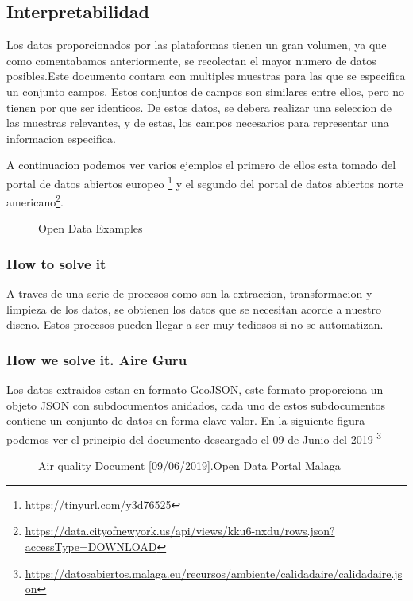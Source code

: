 \subsection{Interpretabilidad}

Los datos proporcionados por las plataformas tienen un gran volumen, ya que como comentabamos anteriormente, se recolectan
el mayor numero de datos posibles.Este documento contara con multiples muestras para las que
se especifica un conjunto campos. Estos conjuntos de campos son similares entre ellos, pero no tienen por que ser identicos. 
De estos datos, se debera realizar una seleccion de las muestras relevantes, y de estas, los campos necesarios para representar
una informacion especifica.


A continuacion podemos ver varios ejemplos el primero de ellos esta tomado del portal de datos abiertos europeo
\footnote{\url{https://tinyurl.com/y3d76525}} y el segundo del portal de datos abiertos norte americano\footnote{\url{https://data.cityofnewyork.us/api/views/kku6-nxdu/rows.json?accessType=DOWNLOAD}}.

\begin{figure}[h]
    \centering
    \hfill
    \caption{Open Data Examples}
\end{figure}

    

    
\subsubsection{How to solve it} 
A traves de una serie de procesos como son  la extraccion, transformacion y 
limpieza de los datos, se obtienen los datos que se necesitan acorde a nuestro diseno. Estos procesos pueden llegar
a ser muy tediosos si no se automatizan.

\subsubsection{How we solve it. Aire Guru} 

Los datos extraidos estan en formato GeoJSON, este formato proporciona un objeto JSON con subdocumentos anidados, cada uno de estos
subdocumentos contiene un conjunto de datos en forma clave valor. 
En la siguiente figura podemos ver el principio del documento descargado el 09 de Junio del 2019 
\footnote{\url{https://datosabiertos.malaga.eu/recursos/ambiente/calidadaire/calidadaire.json}}\\
\newpage
\begin{figure}[h]
    \centering
   \hfill
 
    \caption{Air quality Document [09/06/2019].Open Data Portal Malaga}
    \end{figure}
    
